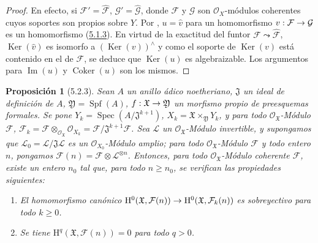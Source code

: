 \documentclass[10pt,oneside,openany]{book}
\theoremstyle{egaenv}\newtheorem*{env}{---}
\theoremstyle{egastatement}
\newtheorem*{proposition}{Proposición}
\theoremstyle{egadescription}
\renewcommand{\geq}{\geqslant}
\renewcommand{\to}{\mathchoice{\longrightarrow}{\rightarrow}{\rightarrow}{\rightarrow}}
\begin{document}
\begin{proof}
En efecto, si $\mathcal F'=\widehat{\mathcal F}$,
$\mathcal G'=\widehat{\mathcal G}$, donde $\mathcal F$ y $\mathcal G$ son $\mathcal O_X$-módulos coherentes cuyos
soportes son propios sobre $Y$. Por ,
$u=\widehat v$ para un homomorfismo
$v:\mathcal F\to\mathcal G$ es un homomorfismo
(\hyperref[III.5.1.3-fr]{5.1.3}). En virtud de la exactitud del funtor
$\mathcal F\leadsto\widehat{\mathcal F}$,
$\operatorname{Ker}(\widehat v)$ es isomorfo a
$(\operatorname{Ker}(v))^{\wedge}$ y como el soporte de
$\operatorname{Ker}(v)$ está contenido en el de $\mathcal F$, se deduce que
$\operatorname{Ker}(u)$ es algebraizable. Los argumentos para $\operatorname{Im}(u)$ y
$\operatorname{Coker}(u)$ son los mismos.
\end{proof}

\begin{proposition}[5.2.3]
\label{III.5.2.3-fr}
Sean $A$ un anillo ádico noetheriano, $\mathfrak J$ un ideal de definición de
$A$, $\mathfrak Y=\operatorname{Spf}(A)$,
$f:\mathfrak X\to\mathfrak Y$ un morfismo propio de preesquemas formales. Se pone
$Y_k=\operatorname{Spec}(A/\mathfrak J^{k+1})$,
$X_k=\mathfrak X\times_{\mathfrak Y}Y_k$, y para todo
$\mathcal O_{\mathfrak X}$-Módulo $\mathcal F$,
$\mathcal F_k=\mathcal F\otimes_{\mathcal O_{\mathfrak X}}\mathcal O_{X_k}
=\mathcal F/\mathfrak J^{k+1}\mathcal F$.
Sea $\mathcal L$ un $\mathcal O_{\mathfrak X}$-Módulo invertible, y supongamos que
$\mathcal L_0=\mathcal L/\mathfrak J\mathcal L$ es un
$\mathcal O_{X_0}$-Módulo amplio; para todo $\mathcal O_{\mathfrak X}$-Módulo
$\mathcal F$ y todo entero $n$, pongamos
$\mathcal F(n)=\mathcal F\otimes\mathcal L^{\otimes n}$. Entonces, para todo
$\mathcal O_{\mathfrak X}$-Módulo coherente $\mathcal F$, existe un entero $n_0$
tal que, para todo $n\geq n_0$, se verifican las propiedades siguientes:
\begin{enumerate}
\item[\textup{(i)}] El homomorfismo canónico
$\mathrm H^0(\mathfrak X,\mathcal F(n))\to
\mathrm H^0(\mathfrak X,\mathcal F_k(n))$ es sobreyectivo para todo $k\geq0$.
\item[\textup{(ii)}] Se tiene $\mathrm H^q(\mathfrak X,\mathcal F(n))=0$ para todo $q>0$.
\end{enumerate}
\end{proposition}
\end{document}
